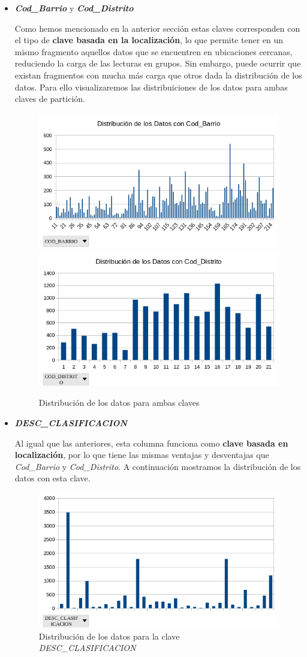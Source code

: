 \documentclass[]{article}
\begin{document}
\begin{itemize}
    \item \textbf{\textit{Cod\_Barrio}} y \textbf{\textit{Cod\_Distrito}}
    
    Como hemos mencionado en la anterior sección estas claves corresponden con el tipo de \textbf{clave basada en la localización}, lo que permite tener en un mismo fragmento aquellos datos que se encuentren en ubicaciones cercanas, reduciendo la carga de las lecturas en grupos. Sin embargo, puede ocurrir que existan fragmentos con mucha más carga que otros dada la distribución de los datos. Para ello visualizaremos las distribuiciones de los datos para ambas claves de partición.

    \begin{figure}[H]
        \includegraphics[width=0.45\linewidth]{Distribucion_Juegos_Cod_Barrio.png}
        \includegraphics[width=0.45\linewidth]{Distribucion_Juegos_Cod_Distrito.png}
        \caption{Distribución de los datos para ambas claves}
    \end{figure}

    \item \textbf{\textit{DESC\_CLASIFICACION}}
    
    Al igual que las anteriores, esta columna funciona como \textbf{clave basada en localización}, por lo que tiene las mismas ventajas y desventajas que \textit{Cod\_Barrio} y \textit{Cod\_Distrito}. A continuación mostramos la distribución de los datos con esta clave.

    \begin{figure}[H]
        \includegraphics[width=0.90\linewidth]{Distribucion_Juegos_DESC_CLASIFICACION.png}
        \caption{Distribución de los datos para la clave \textit{DESC\_CLASIFICACION}}
    \end{figure}


\end{itemize}
\end{document}
